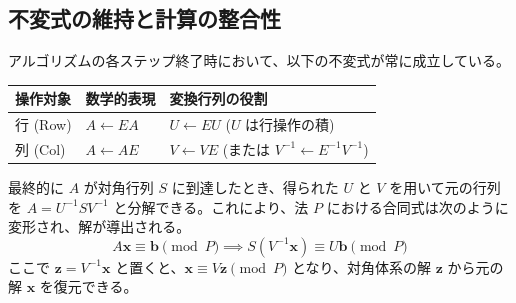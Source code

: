 \documentclass[a4paper,11pt,dvipdfmx]{jsarticle}
\theoremstyle{definition}
\begin{document}
\subsection{不変式の維持と計算の整合性}
アルゴリズムの各ステップ終了時において、以下の不変式が常に成立している。
\begin{table}[h]
\centering
\begin{tabular}{|l|l|l|}
\hline
操作対象 & 数学的表現 & 変換行列の役割 \\ \hline
行 (Row) & $A \leftarrow E A$ & $U \leftarrow E U$ ($U$ は行操作の積) \\ \hline
列 (Col) & $A \leftarrow A E$ & $V \leftarrow V E$ (または $V^{-1} \leftarrow E^{-1} V^{-1}$) \\ \hline
\end{tabular}
\end{table}

最終的に $A$ が対角行列 $S$ に到達したとき、得られた $U$ と $V$ を用いて元の行列を $A = U^{-1} S V^{-1}$ と分解できる。これにより、法 $P$ における合同式は次のように変形され、解が導出される。
\begin{equation}
    A\mathbf{x} \equiv \mathbf{b} \pmod{P} \implies S(V^{-1}\mathbf{x}) \equiv U\mathbf{b} \pmod{P}
\end{equation}
ここで $\mathbf{z} = V^{-1}\mathbf{x}$ と置くと、$\mathbf{x} \equiv V\mathbf{z} \pmod{P}$ となり、対角体系の解 $\mathbf{z}$ から元の解 $\mathbf{x}$ を復元できる。
\end{document}
